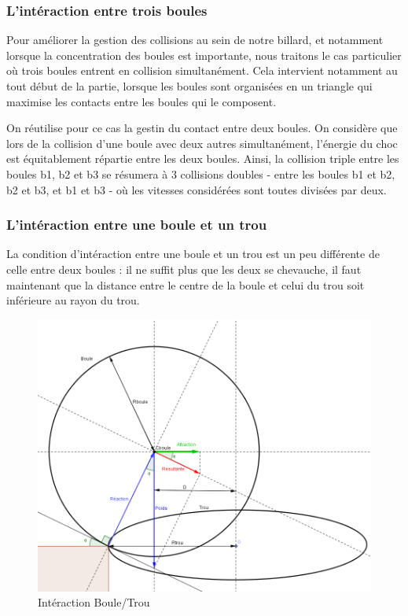 \documentclass[a4paper,11pt]{article}
\begin{document}
\subsubsection{L'intéraction entre trois boules}
Pour améliorer la gestion des collisions au sein de notre billard, et notamment lorsque la concentration
des boules est importante, nous traitons le cas particulier où trois boules entrent en collision simultanément.
Cela intervient notamment au tout début de la partie, lorsque les boules sont organisées en un triangle qui
maximise les contacts entre les boules qui le composent.

On réutilise pour ce cas la gestin du contact entre deux boules. On considère que lors de la collision d'une
boule avec deux autres simultanément, l'énergie du choc est équitablement répartie entre les deux boules.
Ainsi, la collision triple entre les boules b1, b2 et b3 se résumera à 3 collisions doubles - entre les boules
b1 et b2, b2 et b3, et b1 et b3 - où les vitesses considérées sont toutes divisées par deux.

\subsubsection{L'intéraction entre une boule et un trou}
La condition d'intéraction entre une boule et un trou est un peu différente de celle entre deux boules :
il ne suffit plus que les deux se chevauche, il faut maintenant que la distance entre le centre de la boule
et celui du trou soit inférieure au rayon du trou.
\begin{figure}[h]
\caption{Intéraction Boule/Trou}
\includegraphics[scale = 0.7]{schema.png}
\end{figure}
\end{document}
